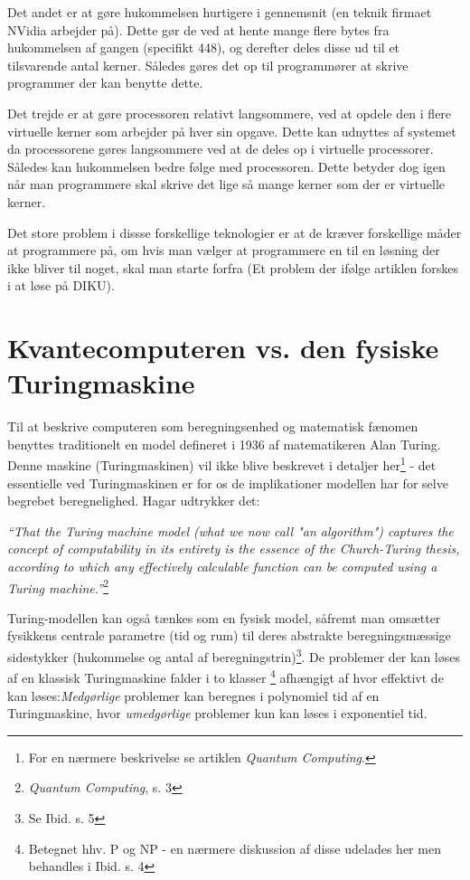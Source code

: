 \documentclass[10pt,a4paper]{article}
\newcommand{\citat}[2]{\begin{justify}\textit{``#1''}\hspace{0.1cm}\footnote{#2}\end{justify}}
\begin{document}
Det andet er at gøre hukommelsen hurtigere i gennemsnit (en teknik firmaet
NVidia arbejder på). Dette gør de ved at hente mange flere bytes fra hukommelsen
af gangen (specifikt 448), og derefter deles disse ud til et tilsvarende antal
kerner. Således gøres det op til programmører at skrive programmer der kan
benytte dette.

Det trejde er at gøre processoren relativt langsommere, ved at opdele den i
flere virtuelle kerner som arbejder på hver sin opgave. Dette kan udnyttes af
systemet da processorene gøres langsommere ved at de deles op i virtuelle
processorer. Således kan hukommelsen bedre følge med processoren. Dette betyder
dog igen når man programmere skal skrive det lige så mange kerner som der er
virtuelle kerner.

Det store problem i dissse forskellige teknologier er at de kræver forskellige
måder at programmere på, om hvis man vælger at programmere en til en løsning der
ikke bliver til noget, skal man starte forfra (Et problem der ifølge artiklen
forskes i at løse på DIKU).

\section{Kvantecomputeren vs. den fysiske Turingmaskine}
Til at beskrive computeren som beregningsenhed og matematisk fænomen
benyttes traditionelt en model defineret i 1936 af matematikeren Alan Turing. 
Denne maskine (Turingmaskinen) vil ikke blive beskrevet i detaljer
her\footnote{For en nærmere beskrivelse se artiklen \textit{Quantum Computing}.}
- det essentielle ved Turingmaskinen er for os de implikationer modellen har
for selve begrebet beregnelighed. Hagar udtrykker det:

\citat{That the Turing machine model (what we now call "an algorithm") captures
the concept of computability in its entirety is the essence of the Church-Turing
thesis, according to which any effectively calculable function can be computed 
using a Turing machine.}
{\textit{Quantum Computing}, s. 3}

Turing-modellen kan også tænkes som en fysisk model, såfremt man 
omsætter fysikkens centrale parametre (tid og rum) til deres 
abstrakte beregningsmæssige sidestykker (hukommelse og antal 
af beregningstrin)\footnote{Se Ibid. s. 5}. 
De problemer der kan løses af en klassisk Turingmaskine falder i 
to klasser \footnote{Betegnet hhv. P og NP - en nærmere diskussion
af disse udelades her men behandles i Ibid. s. 4} afhængigt af hvor
 effektivt de kan løses:\emph{Medgørlige} problemer kan beregnes i
 polynomiel tid af en Turingmaskine, hvor \emph{umedgørlige} problemer
kun kan løses i exponentiel tid. 
\end{document}
